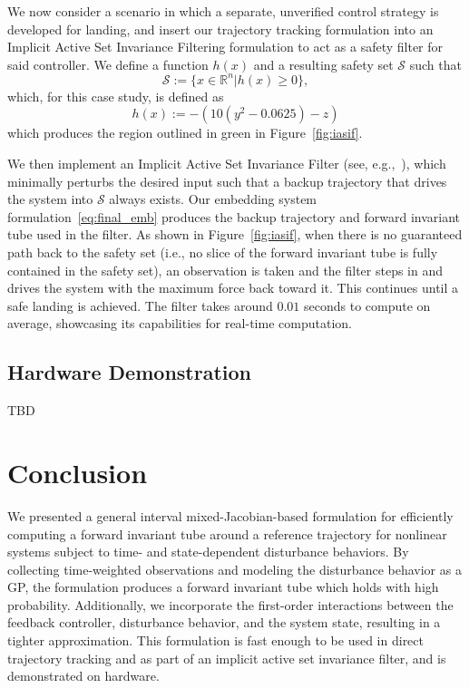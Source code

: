 \documentclass[preprint,12pt]{elsarticle}
\begin{document}
We now consider a scenario in which a separate, unverified control strategy is developed for landing, and insert our trajectory tracking formulation into an Implicit Active Set Invariance Filtering formulation to act as a safety filter for said controller. We define a function $h(x)$ and a resulting safety set $\mathcal{S}$ such that
\begin{equation}
    \mathcal{S}:= \{x \in \mathbb{R}^n | h(x) \geq 0\},
\end{equation}
which, for this case study, is defined as
\begin{equation}
    h(x) := -(10(y^2 - 0.0625) - z)
\end{equation}
which produces the region outlined in green in Figure~\ref{fig:iasif}.

We then implement an Implicit Active Set Invariance Filter (see, e.g.,~\cite{llanesIASIF}), which minimally perturbs the desired input such that a backup trajectory that drives the system into $\mathcal{S}$ always exists. Our embedding system formulation~\eqref{eq:final_emb} produces the backup trajectory and forward invariant tube used in the filter. As shown in Figure~\ref{fig:iasif}, when there is no guaranteed path back to the safety set (i.e., no slice of the forward invariant tube is fully contained in the safety set), an observation is taken and the filter steps in and drives the system with the maximum force back toward it. This continues until a safe landing is achieved. The filter takes around $0.01$ seconds to compute on average, showcasing its capabilities for real-time computation.

\subsection{Hardware Demonstration}
TBD

\section{Conclusion}
\label{section:conclusion}
We presented a general interval mixed-Jacobian-based formulation for efficiently computing a forward invariant tube around a reference trajectory for nonlinear systems subject to time- and state-dependent disturbance behaviors. By collecting time-weighted observations and modeling the disturbance behavior as a \ac{GP}, the formulation produces a forward invariant tube which holds with high probability. Additionally, we incorporate the first-order interactions between the feedback controller, disturbance behavior, and the system state, resulting in a tighter approximation. This formulation is fast enough to be used in direct trajectory tracking and as part of an implicit active set invariance filter, and is demonstrated on hardware.
\end{document}
